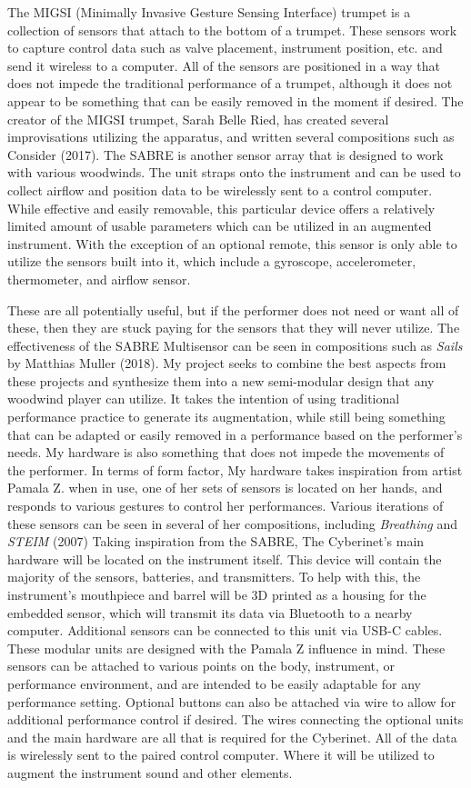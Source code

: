 The MIGSI (Minimally Invasive Gesture Sensing Interface) trumpet is a collection of sensors that attach to the bottom of a trumpet. These sensors work to capture control data such as valve placement, instrument position, etc. and send it wireless to a computer. All of the sensors are positioned in a way that does not impede the traditional performance of a trumpet, although it does not appear to be something that can be easily removed in the moment if desired.
The creator of the MIGSI trumpet, Sarah Belle Ried, has created several improvisations utilizing the apparatus, and written several compositions such as Consider (2017). The SABRE is another sensor array that is designed to work with various woodwinds. The unit straps onto the instrument and can be used to collect airflow and position data to be wirelessly sent to a control computer. While effective and easily removable, this particular device offers a relatively limited amount of usable parameters which can be utilized in an augmented instrument. With the exception of an optional remote, this sensor is only able to utilize the sensors built into it, which include a gyroscope, accelerometer, thermometer, and airflow sensor.

These are all potentially useful, but if the performer does not need or want all of these, then they are stuck paying for the sensors that they will never utilize. The effectiveness of the SABRE Multisensor can be seen in compositions such as \textit{Sails} by Matthias Muller (2018). 
My project seeks to combine the best aspects from these projects and synthesize them into a new semi-modular design that any woodwind player can utilize. It takes the intention of using traditional performance practice to generate its augmentation, while still being something that can be adapted or easily removed in a performance based on the performer’s needs. My hardware is also something that does not impede the movements of the performer. In terms of form factor, My hardware takes inspiration from artist Pamala Z. when in use, one of her sets of sensors is located on her hands, and responds to various gestures to control her performances. Various iterations of these sensors can be seen in several of her compositions, including \textit{Breathing} and \textit{STEIM} (2007)
Taking inspiration from the SABRE, The Cyberinet's main hardware will be located on the instrument itself. This device will contain the majority of the sensors, batteries, and transmitters. To help with this, the instrument’s mouthpiece and barrel will be 3D printed as a housing for the embedded sensor, which will transmit its data via Bluetooth to a nearby computer.
Additional sensors can be connected to this unit via USB-C cables. These modular units are designed with the Pamala Z influence in mind. These sensors can be attached to various points on the body, instrument, or performance environment, and are intended to be easily adaptable for any performance setting.
Optional buttons can also be attached via wire to allow for additional performance control if desired. The wires connecting the optional units and the main hardware are all that is required for the Cyberinet. All of the data is wirelessly sent to the paired control computer. Where it will be utilized to augment the instrument sound and other elements.


